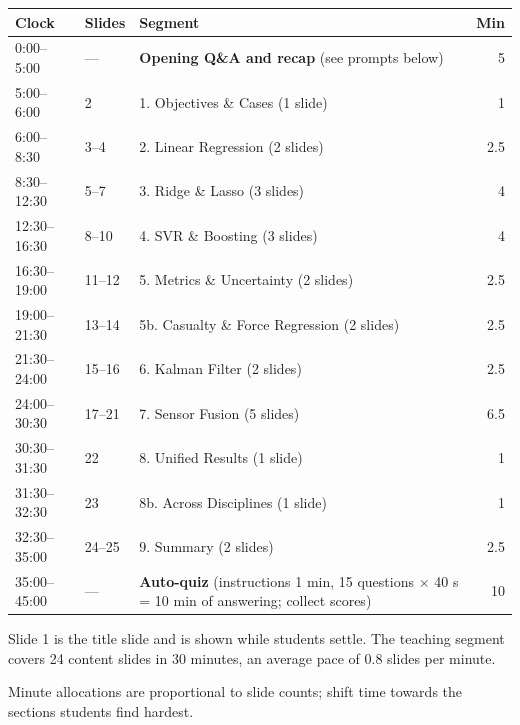 \documentclass[11pt]{article}
\begin{document}
\begin{center}\small\renewcommand{\arraystretch}{1.2}\begin{tabularx}{\textwidth}{@{}l l X r@{}}\toprule\textbf{Clock} & \textbf{Slides} & \textbf{Segment} & \textbf{Min}\\\midrule

0:00--5:00 & --- & \textbf{Opening Q\&A and recap} (see prompts below) & 5\\

5:00--6:00 & 2 & 1. Objectives \& Cases (1 slide) & 1\\

6:00--8:30 & 3--4 & 2. Linear Regression (2 slides) & 2.5\\

8:30--12:30 & 5--7 & 3. Ridge \& Lasso (3 slides) & 4\\

12:30--16:30 & 8--10 & 4. SVR \& Boosting (3 slides) & 4\\

16:30--19:00 & 11--12 & 5. Metrics \& Uncertainty (2 slides) & 2.5\\

19:00--21:30 & 13--14 & 5b. Casualty \& Force Regression (2 slides) & 2.5\\

21:30--24:00 & 15--16 & 6. Kalman Filter (2 slides) & 2.5\\

24:00--30:30 & 17--21 & 7. Sensor Fusion (5 slides) & 6.5\\

30:30--31:30 & 22 & 8. Unified Results (1 slide) & 1\\

31:30--32:30 & 23 & 8b. Across Disciplines (1 slide) & 1\\

32:30--35:00 & 24--25 & 9. Summary (2 slides) & 2.5\\

35:00--45:00 & --- & \textbf{Auto-quiz} (instructions 1 min, 15 questions $\times$ 40 s = 10 min of answering; collect scores) & 10\\\bottomrule\end{tabularx}\end{center}

Slide 1 is the title slide and is shown while students settle. The teaching segment covers 24 content slides in 30 minutes, an average pace of 0.8 slides per minute. 

Minute allocations are proportional to slide counts; shift time towards the sections students find hardest.
\end{document}
